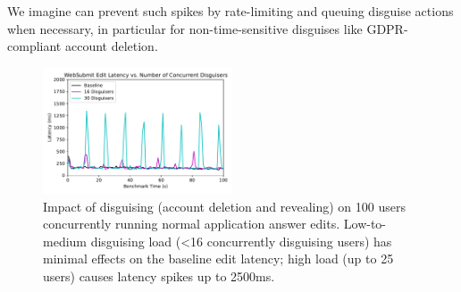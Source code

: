 We imagine \sys can prevent such spikes by rate-limiting and queuing disguise actions when
necessary, in particular for non-time-sensitive disguises like GDPR-compliant account deletion.


\begin{figure}[t!]
    \centering
        \includegraphics[width=0.5\textwidth]{figs/websubmit_concurrent_results_20lec_100users}
    \caption{Impact of disguising (account deletion and revealing) on 100 users concurrently running
    normal application answer edits. Low-to-medium disguising load (<16 concurrently disguising users) has
    minimal effects on the baseline edit latency; high load (up to 25 users) causes latency spikes
    up to 2500ms.} 
    \label{fig:concurrent}
\end{figure}
